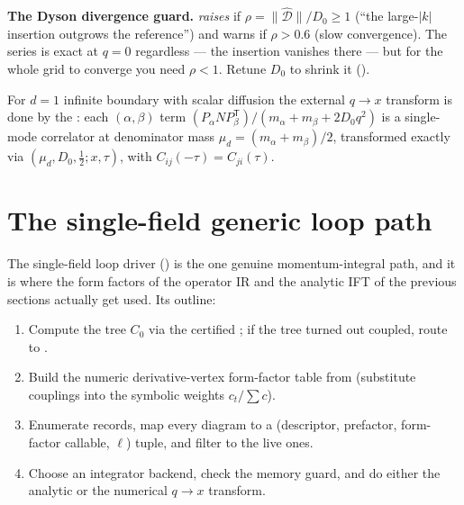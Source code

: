 \begin{gotcha}
\textbf{The Dyson divergence guard.} 
\emph{raises}  if $\rho=\lVert\widehat{\mathcal{D}}\rVert/D_{0}\ge1$
(``the large-$|k|$ insertion outgrows the reference'') and warns if $\rho>0.6$
(slow convergence). The series is exact at $q=0$ regardless --- the insertion
vanishes there --- but for the whole grid to converge you need $\rho<1$. Retune
$D_{0}$ to shrink it ().
\end{gotcha}

For $d=1$ infinite boundary with scalar diffusion the external $q\to x$ transform
is done by the : each $(\alpha,\beta)$ term
$(P_{\alpha}NP_{\beta}^{\mathsf T})/(m_{\alpha}+m_{\beta}+2D_{0}q^{2})$ is a
single-mode correlator at denominator mass $\mu_{d}=(m_{\alpha}+m_{\beta})/2$,
transformed exactly via $(\mu_{d},D_{0},\tfrac12;x,\tau)$,
with $C_{ij}(-\tau)=C_{ji}(\tau)$.

\section{The single-field generic loop path}

The single-field loop driver 
() is the one genuine momentum-integral path, and
it is where the form factors of the operator IR and the analytic IFT of the
previous sections actually get used. Its outline:

\begin{enumerate}
  \item Compute the tree $C_{0}$ via the certified
        ; if the tree turned
        out coupled, route to .
  \item Build the numeric derivative-vertex form-factor table from
         (substitute couplings into the
        symbolic weights $c_{t}/\sum c$).
  \item Enumerate records, map every diagram to a (descriptor, prefactor,
        form-factor callable, $\ell$) tuple, and filter to the live ones.
  \item Choose an integrator backend, check the memory guard, and do either the
        analytic or the numerical $q\to x$ transform.
\end{enumerate}

